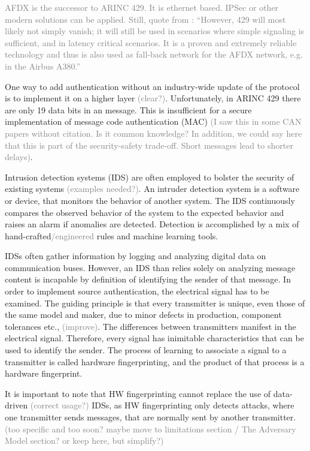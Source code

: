 \documentclass[conference]{IEEEtran}
\begin{document}
  \textcolor{gray}{AFDX is the successor to ARINC 429. It is ethernet based. IPSec or other modern solutions can be applied. Still, quote from \cite{fuchs2012evolution}: ``However, 429 will most likely not simply vanish; it will still be used in scenarios where simple signaling is sufficient, and in latency critical scenarios. It is a proven and extremely reliable technology and thus is also used as fall-back network for the AFDX network, e.g. in the Airbus A380.''}
  
  One way to add authentication without an industry-wide update of the protocol is to implement it on a higher layer \textcolor{gray}{(clear?)}. Unfortunately, in ARINC 429 there are only 19 data bits in an message. This is insufficient for a secure implementation of message code authentication (MAC) \textcolor{gray}{(I saw this in some CAN papers without citation. Is it common knowledge? In addition, we could say here that this is part of the security-safety trade-off. Short messages lead to shorter delays)}.
  
  Intrusion detection systems (IDS) are often employed to bolster the security of existing systems \textcolor{gray}{(examples needed?)}. An intruder detection system is a software or device, that monitors the behavior of another system. The IDS continuously compares the observed behavior of the system to the expected behavior and raises an alarm if anomalies are detected. Detection is accomplished by a mix of hand-crafted\textcolor{gray}{/engineered} rules and machine learning tools. 
  
  IDSs often gather information by logging and analyzing digital data on communication buses. However, an IDS than relies solely on analyzing message content is incapable by definition of identifying the sender of that message. In order to implement source authentication, the electrical signal has to be examined. The guiding principle is that every transmitter is unique, even those of the same model and maker, due to minor defects in production, component tolerances etc., \textcolor{gray}{(improve)}. The differences between transmitters manifest in the electrical signal. Therefore, every signal has inimitable characteristics that can be used to identify the sender. The process of learning to associate a signal to a transmitter is called hardware fingerprinting, and the product of that process is a hardware fingerprint.
  
  It is important to note that HW fingerprinting cannot replace the use of data-driven \textcolor{gray}{(correct usage?)} IDSs, as HW fingerprinting only detects attacks, where one transmitter sends messages, that are normally sent by another transmitter. \textcolor{gray}{(too specific and too soon? maybe move to limitations section / The Adversary Model section? or keep here, but simplify?)}
  
\end{document}
